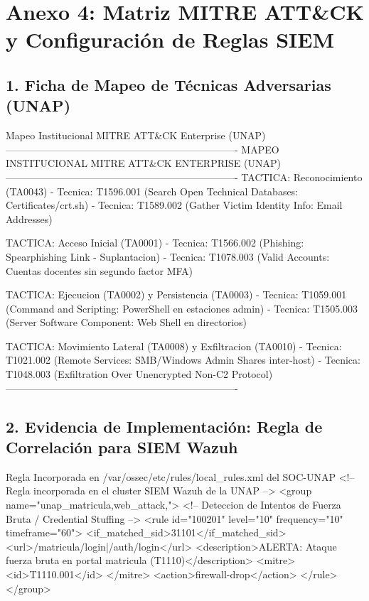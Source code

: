 \section*{Anexo 4: Matriz MITRE ATT\&CK y Configuración de Reglas SIEM}

\subsection*{1. Ficha de Mapeo de Técnicas Adversarias (UNAP)}

\begin{cmdbox}{Mapeo Institucional MITRE ATT\&CK Enterprise (UNAP)}
----------------------------------------------------------------------
          MAPEO INSTITUCIONAL MITRE ATT&CK ENTERPRISE (UNAP)
----------------------------------------------------------------------
TACTICA: Reconocimiento (TA0043)
- Tecnica: T1596.001 (Search Open Technical Databases: Certificates/crt.sh)
- Tecnica: T1589.002 (Gather Victim Identity Info: Email Addresses)

TACTICA: Acceso Inicial (TA0001)
- Tecnica: T1566.002 (Phishing: Spearphishing Link - Suplantacion)
- Tecnica: T1078.003 (Valid Accounts: Cuentas docentes sin segundo factor MFA)

TACTICA: Ejecucion (TA0002) y Persistencia (TA0003)
- Tecnica: T1059.001 (Command and Scripting: PowerShell en estaciones admin)
- Tecnica: T1505.003 (Server Software Component: Web Shell en directorios)

TACTICA: Movimiento Lateral (TA0008) y Exfiltracion (TA0010)
- Tecnica: T1021.002 (Remote Services: SMB/Windows Admin Shares inter-host)
- Tecnica: T1048.003 (Exfiltration Over Unencrypted Non-C2 Protocol)
----------------------------------------------------------------------
\end{cmdbox}

\subsection*{2. Evidencia de Implementación: Regla de Correlación para SIEM Wazuh}

\begin{cmdbox}{Regla Incorporada en /var/ossec/etc/rules/local\_rules.xml del SOC-UNAP}
<!-- Regla incorporada en el cluster SIEM Wazuh de la UNAP -->
<group name="unap_matricula,web_attack,">
  <!-- Deteccion de Intentos de Fuerza Bruta / Credential Stuffing -->
  <rule id="100201" level="10" frequency="10" timeframe="60">
    <if_matched_sid>31101</if_matched_sid>
    <url>/matricula/login|/auth/login</url>
    <description>ALERTA: Ataque fuerza bruta en portal matricula (T1110)</description>
    <mitre>
      <id>T1110.001</id>
    </mitre>
    <action>firewall-drop</action>
  </rule>
</group>
\end{cmdbox}

